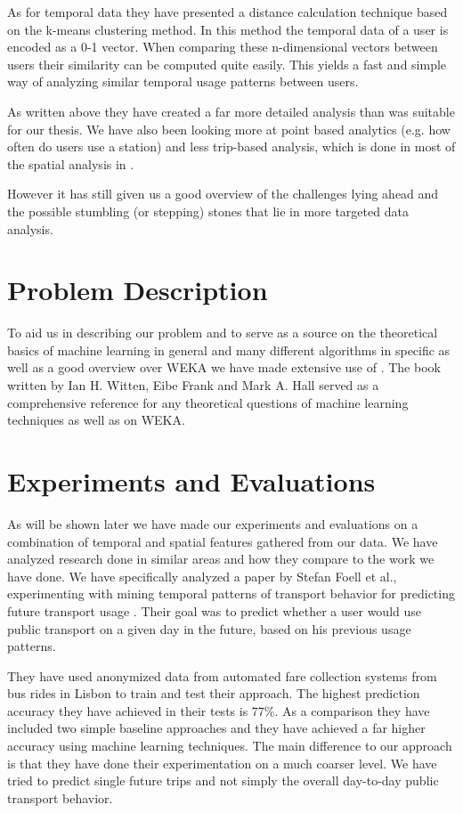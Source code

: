 As for temporal data they have presented a distance calculation technique based on the k-means clustering method. In this method the temporal data of a user is encoded as a 0-1 vector. When comparing these n-dimensional vectors between users their similarity can be computed quite easily. This yields a fast and simple way of analyzing similar temporal usage patterns between users.

As written above they have created a far more detailed analysis than was suitable for our thesis. We have also been looking more at point based analytics (e.g. how often do users use a station) and less trip-based analysis, which is done in most of the spatial analysis in \cite{RelatedWorkDataAnalysis}.

However it has still given us a good overview of the challenges lying ahead and the possible stumbling (or stepping) stones that lie in more targeted data analysis.


\section{Problem Description}
To aid us in describing our problem and to serve as a source on the theoretical basics of machine learning in general and many different algorithms in specific as well as a good overview over WEKA we have made extensive use of \cite{DataMining}. The book written by Ian H. Witten, Eibe Frank and Mark A. Hall served as a comprehensive reference for any theoretical questions of machine learning techniques as well as on WEKA. 

\section{Experiments and Evaluations}
As will be shown later we have made our experiments and evaluations on a combination of temporal and spatial features gathered from our data. We have analyzed research done in similar areas and how they compare to the work we have done. We have specifically analyzed a paper by Stefan Foell et al., experimenting with mining temporal patterns of transport behavior for predicting future transport usage \cite{RelatedWorkTemporalPatterns}. Their goal was to predict whether a user would use public transport on a given day in the future, based on his previous usage patterns.

They have used anonymized data from automated fare collection systems from bus rides in Lisbon to train and test their approach. The highest prediction accuracy they have achieved in their tests is 77\%. As a comparison they have included two simple baseline approaches and they have achieved a far higher accuracy using machine learning techniques. The main difference to our approach is that they have done their experimentation on a much coarser level. We have tried to predict single future trips and not simply the overall day-to-day public transport behavior.

